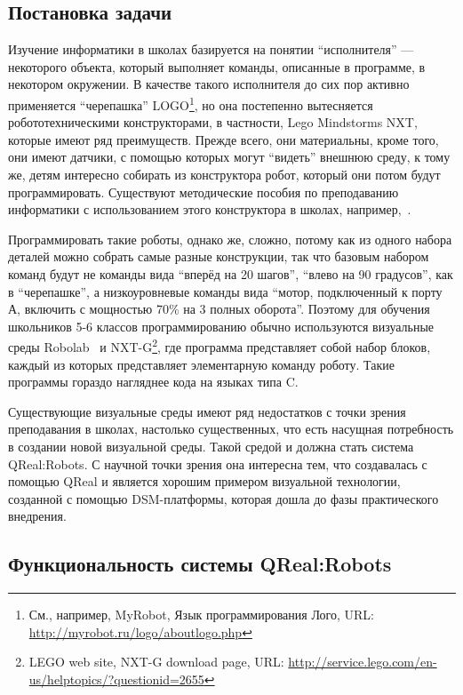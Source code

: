\documentclass[a4, 12pt]{article}
\begin{document}
\subsection{Постановка задачи}

Изучение информатики в школах базируется на понятии “исполнителя” --- некоторого объекта, который выполняет команды, описанные в программе, в некотором окружении. В качестве такого исполнителя до сих пор активно применяется ``черепашка'' LOGO\footnote{См., например, MyRobot, Язык программирования Лого, URL: \url{http://myrobot.ru/logo/aboutlogo.php}}, но она постепенно вытесняется робототехническими конструкторами, в частности, Lego Mindstorms NXT, которые имеют ряд преимуществ. Прежде всего, они материальны, кроме того, они имеют датчики, с помощью которых могут “видеть” внешнюю среду, к тому же, детям интересно собирать из конструктора робот, который они потом будут программировать. Существуют методические пособия по преподаванию информатики с использованием этого конструктора в школах, например,~\cite{lego}.

Программировать такие роботы, однако же, сложно, потому как из одного набора деталей можно собрать самые разные конструкции, так что базовым набором команд будут не команды вида ``вперёд на 20 шагов'', ``влево на 90 градусов'', как в ``черепашке'', а низкоуровневые команды вида ``мотор, подключенный к порту А, включить с мощностью 70\% на 3 полных оборота''. Поэтому для обучения школьников 5-6 классов программированию обычно используются визуальные среды Robolab~\cite{robolab} и NXT-G\footnote{LEGO web site, NXT-G download page, URL: \url{http://service.lego.com/en-us/helptopics/?questionid=2655}}, где программа представляет собой набор блоков, каждый из которых представляет элементарную команду роботу. Такие программы гораздо нагляднее кода на языках типа C.

Существующие визуальные среды имеют ряд недостатков с точки зрения преподавания в школах, настолько существенных, что есть насущная потребность в создании новой визуальной среды. Такой средой и должна стать система QReal:Robots. С научной точки зрения она интересна тем, что создавалась с помощью QReal и является хорошим примером визуальной технологии, созданной с помощью DSM-платформы, которая дошла до фазы практического внедрения.

\subsection{Функциональность системы QReal:Robots}
\end{document}
